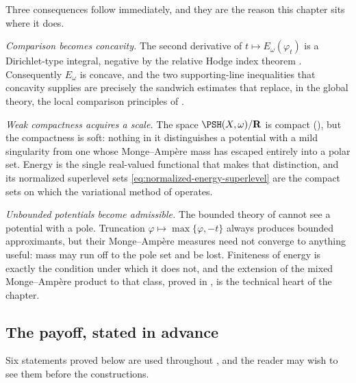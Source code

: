 Three consequences follow immediately, and they are the reason this chapter
sits where it does.

\emph{Comparison becomes concavity.}  The second derivative of
\(t\mapsto E_\omega(\varphi_t)\) is a Dirichlet-type integral, negative by
the relative Hodge index theorem .  Consequently
\(E_\omega\) is concave, and the two supporting-line inequalities that
concavity supplies are precisely the sandwich estimates that replace, in the
global theory, the local comparison principles of .

\emph{Weak compactness acquires a scale.}  The space
\(\PSH(X,\omega)/\mathbf R\) is compact
(), but the compactness is soft: nothing in it
distinguishes a potential with a mild singularity from one whose
Monge--Amp\`ere mass has escaped entirely into a polar set.  Energy is the
single real-valued functional that makes that distinction, and its normalized
superlevel sets \eqref{eq:normalized-energy-superlevel} are the compact sets
on which the variational method of
 operates.

\emph{Unbounded potentials become admissible.}  The bounded theory of
 cannot see a potential with a pole.  Truncation
\(\varphi\mapsto\max\{\varphi,-t\}\) always produces bounded approximants, but
their Monge--Amp\`ere measures need not converge to anything useful: mass may
run off to the pole set and be lost.  Finiteness of energy is exactly the
condition under which it does not, and the extension of the mixed
Monge--Amp\`ere product to that class, proved in
, is the technical heart of the chapter.

\subsection{The payoff, stated in advance}
\label{sec:ch26-payoff}

Six statements proved below are used throughout
, and the reader may
wish to see them before the constructions.


